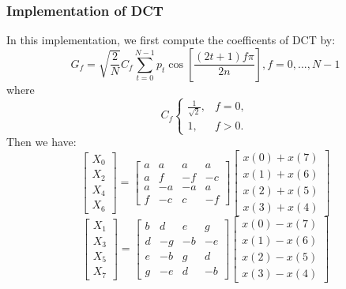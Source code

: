 \subsubsection{Implementation of DCT}
In this implementation, we first compute the coefficents of DCT by:
\[
G_{f} = \sqrt{\frac{2}{N}}C_{f}\sum_{t=0}^{N-1}p_{t}\cos[\frac{(2t+1)f\pi}{2n}],f = 0,...,N\!\!-\!\!1
\]
where \[ C_{f} \left\{ \begin{array}{ll}
\frac{1}{\sqrt{2}}, & f = 0, \\ 1, & f > 0.
\end{array}
\right.
\]
Then we have:
\[ \left[
\begin{array}{llll}
X_{0} \\ X_{2} \\ X_{4} \\ X_{6}
\end{array}
 \right] = \left[ \begin{array}{cccc}
 a & a & a & a \\ a & f & -f & -c \\ a & -a & -a & a \\ f & -c & c & -f
 \end{array}
 \right] \left[ \begin{array}{llll}
 x(0)+x(7) \\ x(1)+x(6) \\ x(2)+x(5) \\ x(3)+x(4)
 \end{array}
 \right]
\]
\[ \left[
\begin{array}{llll}
X_{1} \\ X_{3} \\ X_{5} \\ X_{7}
\end{array}
 \right] = \left[ \begin{array}{cccc}
 b & d & e & g \\ d & -g & -b & -e \\ e & -b & g & d \\ g & -e & d & -b
 \end{array}
 \right] \left[ \begin{array}{llll}
 x(0)-x(7) \\ x(1)-x(6) \\ x(2)-x(5) \\ x(3)-x(4)
 \end{array}
 \right]
\]
